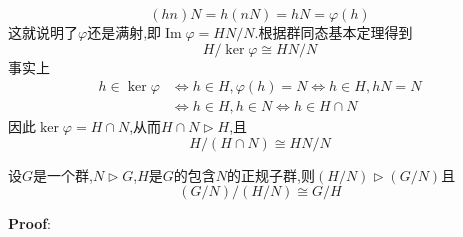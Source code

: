 $$
(hn)N=h(nN)=hN=\varphi(h)
$$
这就说明了$\varphi$还是满射,即$\operatorname{Im}\varphi =HN/N$.根据群同态基本定理得到
$$
H/\ker\varphi\cong HN/N
$$
事实上
$$
\begin{aligned}
    h\in\ker \varphi &\Leftrightarrow h\in H,\varphi(h)=N \Leftrightarrow h\in H,hN=N\\
                    &\Leftrightarrow h\in H,h\in N\Leftrightarrow h\in H\cap N
\end{aligned}
$$
因此$\ker\varphi=H\cap N$,从而$H\cap N\triangleright H$,且
$$
H/(H\cap N)\cong HN/N
$$
\begin{tcolorbox}[colback=KuangNei,colframe=BianKuang,title=\textbf{第二群同构定理},sharpish corners]
    设$G$是一个群,$N\triangleright G$,$H$是$G$的包含$N$的正规子群,则$(H/N)\triangleright (G/N)$且
    $$
    (G/N)/(H/N)\cong G/H
    $$
\end{tcolorbox}
\textbf{Proof}:\quad \par




















